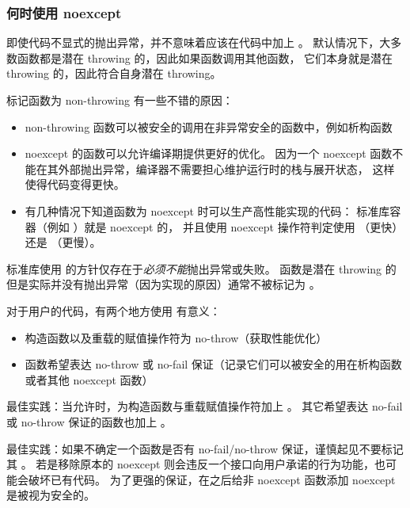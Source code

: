 \documentclass[../../LearnCpp.tex]{subfiles}
\begin{document}
\subsubsection*{何时使用 noexcept}

即使代码不显式的抛出异常，并不意味着应该在代码中加上 。
默认情况下，大多数函数都是潜在 throwing 的，因此如果函数调用其他函数，
它们本身就是潜在 throwing 的，因此符合自身潜在 throwing。

标记函数为 non-throwing 有一些不错的原因：

\begin{itemize}
  \item non-throwing 函数可以被安全的调用在非异常安全的函数中，例如析构函数
  \item noexcept 的函数可以允许编译期提供更好的优化。
        因为一个 noexcept 函数不能在其外部抛出异常，编译器不需要担心维护运行时的栈与展开状态，
        这样使得代码变得更快。
  \item 有几种情况下知道函数为 noexcept 时可以生产高性能实现的代码：
        标准库容器（例如 ）就是 noexcept 的，
        并且使用 noexcept 操作符判定使用 （更快）还是 （更慢）。
\end{itemize}

标准库使用  的方针仅存在于\textit{必须不能}抛出异常或失败。
函数是潜在 throwing 的但是实际并没有抛出异常（因为实现的原因）通常不被标记为 。

对于用户的代码，有两个地方使用  有意义：

\begin{itemize}
  \item 构造函数以及重载的赋值操作符为 no-throw（获取性能优化）
  \item 函数希望表达 no-throw 或 no-fail 保证（记录它们可以被安全的用在析构函数或者其他 noexcept 函数）
\end{itemize}

最佳实践：当允许时，为构造函数与重载赋值操作符加上 。
其它希望表达 no-fail 或 no-throw 保证的函数也加上 。

最佳实践：如果不确定一个函数是否有 no-fail/no-throw 保证，谨慎起见不要标记其 。
若是移除原本的 noexcept 则会违反一个接口向用户承诺的行为功能，也可能会破坏已有代码。
为了更强的保证，在之后给非 noexcept 函数添加 noexcept 是被视为安全的。
\end{document}
